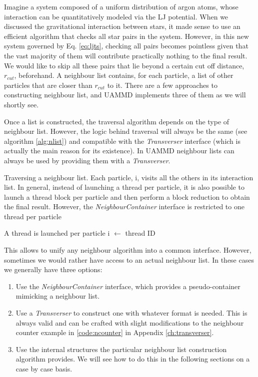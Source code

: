 \documentclass[twoside,openright,titlepage,numbers=noenddot,%
headinclude,footinclude,cleardoublepage=empty,abstract=on,
BCOR=5mm,fontsize=11pt, dvipsnames, paper=b5
]{scrreprt}
\newcommand{\uammd}{\gls{UAMMD}\xspace}
\begin{document}
Imagine a system composed of a uniform distribution of argon atoms, whose interaction can be quantitatively modeled via the \gls{LJ} potential. When we discussed the gravitational interaction between stars, it made sense to use an efficient algorithm that checks all star pairs in the system. However, in this new system governed by Eq. \eqref{eq:ljts}, checking all pairs becomes pointless given that the vast majority of them will contribute practically nothing to the final result. We would like to skip all these pairs that lie beyond a certain cut off distance, $r_{cut}$, beforehand. A neighbour list contains, for each particle, a list of other particles that are closer than $r_{cut}$ to it. There are a few approaches to constructing neighbour list, and \uammd implements three of them as we will shortly see.

Once a list is constructed, the traversal algorithm depends on the type of neighbour list. However, the logic behind traversal will always be the same (see algorithm \ref{alg:nlist}) and compatible with the \emph{Transverser} interface (which is actually the main reason for its existence). In \uammd neighbour lists can always be used by providing them with a \emph{Transverser}.

\begin{algorithm}
  \caption[ ]{Traversing a neighbour list. Each particle, i, visits all the others in its interaction list.
    In general, instead of launching a thread per particle, it is also possible to launch a thread block per particle and then perform a block reduction to obtain the final result. However, the \emph{NeighbourContainer} interface is restricted to one thread per particle}\label{alg:nlist}
  \begin{algorithmic}[1]
    \Require A thread is launched per particle
    \State i $\gets$ thread ID 
    \EndFor
  \end{algorithmic}
\end{algorithm}

This allows to unify any neighbour algorithm into a common interface. However, sometimes we would rather have access to an actual neighbour list. In these cases we generally have three options:
\begin{enumerate}
\item Use the \emph{NeighbourContainer} interface, which provides a pseudo-container mimicking a neighbour list.
\item Use a \emph{Transverser} to construct one with whatever format is needed.
  This is always valid and can be crafted with slight modifications to the neighbour counter example in \ref{code:ncounter} in Appendix \ref{ch:transverser}.
\item Use the internal structures the particular neighbour list construction algorithm provides.
  We will see how to do this in the following sections on a case by case basis.
\end{enumerate}
\end{document}
